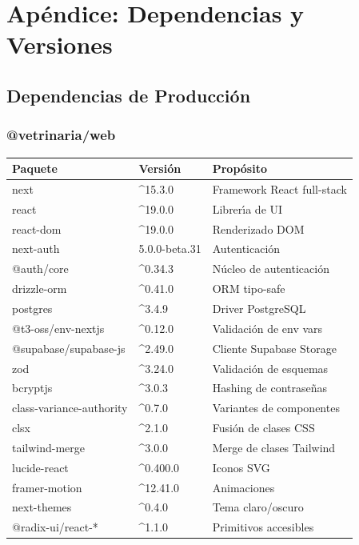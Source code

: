 \chapter{Ap\'endice: Dependencias y Versiones}

\section{Dependencias de Producci\'on}

\subsection{@vetrinaria/web}

\begin{longtable}{|l|l|l|}
\hline
\textbf{Paquete} & \textbf{Versi\'on} & \textbf{Prop\'osito} \\
\hline
\endhead
next & \textasciicircum15.3.0 & Framework React full-stack \\
react & \textasciicircum19.0.0 & Librer\'{\i}a de UI \\
react-dom & \textasciicircum19.0.0 & Renderizado DOM \\
next-auth & 5.0.0-beta.31 & Autenticaci\'on \\
@auth/core & \textasciicircum0.34.3 & N\'ucleo de autenticaci\'on \\
drizzle-orm & \textasciicircum0.41.0 & ORM tipo-safe \\
postgres & \textasciicircum3.4.9 & Driver PostgreSQL \\
@t3-oss/env-nextjs & \textasciicircum0.12.0 & Validaci\'on de env vars \\
@supabase/supabase-js & \textasciicircum2.49.0 & Cliente Supabase Storage \\
zod & \textasciicircum3.24.0 & Validaci\'on de esquemas \\
bcryptjs & \textasciicircum3.0.3 & Hashing de contrase\~nas \\
class-variance-authority & \textasciicircum0.7.0 & Variantes de componentes \\
clsx & \textasciicircum2.1.0 & Fusi\'on de clases CSS \\
tailwind-merge & \textasciicircum3.0.0 & Merge de clases Tailwind \\
lucide-react & \textasciicircum0.400.0 & Iconos SVG \\
framer-motion & \textasciicircum12.41.0 & Animaciones \\
next-themes & \textasciicircum0.4.0 & Tema claro/oscuro \\
@radix-ui/react-* & \textasciicircum1.1.0 & Primitivos accesibles \\
\hline
\end{longtable}

